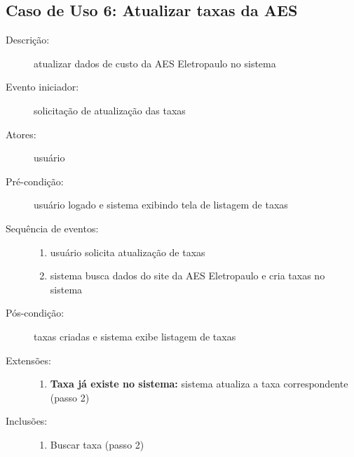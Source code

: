 \subsection{Caso de Uso 6: Atualizar taxas da AES}
\begin{description}
	\item[Descrição:] atualizar dados de custo da AES Eletropaulo no sistema
	\item[Evento iniciador:] solicitação de atualização das taxas
	\item[Atores:] usuário
	\item[Pré-condição:] usuário logado e sistema exibindo tela de listagem de taxas
	\item[Sequência de eventos:] \hfill
		\begin{enumerate}
			\item{usuário solicita atualização de taxas}
			\item{sistema busca dados do site da AES Eletropaulo e cria taxas no sistema}
		\end{enumerate}
	\item[Pós-condição:] taxas criadas e sistema exibe listagem de taxas
	\item[Extensões:] \hfill
		\begin{enumerate}
			\item{\textbf{Taxa já existe no sistema:} sistema atualiza a taxa correspondente (passo 2)}
		\end{enumerate}
	\item[Inclusões:] \hfill
		\begin{enumerate}
			\item{Buscar taxa (passo 2)}
		\end{enumerate}
\end{description}
